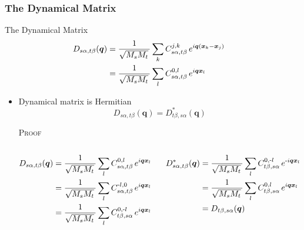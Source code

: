 \begin{frame}
  \frametitle{The Dynamical Matrix}
  The Dynamical Matrix
  \begin{align*}
    \mathcolor{black}{
      D_{s\alpha,t\beta}(\boldsymbol{q})
    }
    &=
    {1\over\sqrt{M_sM_t}\,}
    \sum_k
    C_{s\alpha,t\beta}^{j, k}\,
    e^{i\boldsymbol{q}(\boldsymbol{x}_k - \boldsymbol{x}_j)} \cr
    &=
    {1\over\sqrt{M_sM_t}\,}
    \sum_l
    C_{s\alpha,t\beta}^{0, l}\,
    e^{i\boldsymbol{q}\boldsymbol{x}_l}
  \end{align*}

  \begin{itemize}
  \item Dynamical matrix is Hermitian
    \begin{equation*}
      D_{s\alpha,t\beta}(\boldsymbol{q})
      =
      D^*_{t\beta,s\alpha}(\boldsymbol{q})
    \end{equation*}
    
    \begin{block}{\textsc{Proof}}
      \small
      \begin{columns}[t]
        \begin{column}{0.5\textwidth}
          \begin{align*}
            D_{s\alpha,t\beta}(\boldsymbol{q})
            &=
            {1\over\sqrt{M_sM_t}\,}
            \sum_l
            C_{s\alpha,t\beta}^{0, l}\,
              e^{i\boldsymbol{q}\boldsymbol{x}_l} \cr
            &= 
            {1\over\sqrt{M_sM_t}\,}
            \sum_l
            C_{s\alpha,t\beta}^{\text{-}l, 0}\,
              e^{i\boldsymbol{q}\boldsymbol{x}_l} \cr
            &= 
            {1\over\sqrt{M_sM_t}\,}
            \sum_l
            C_{t\beta,s\alpha}^{0, \text{-}l}\,
              e^{i\boldsymbol{q}\boldsymbol{x}_l} \cr
          \end{align*}
        \end{column}
        \begin{column}{0.4\textwidth}
          \begin{align*}
            D^*_{s\alpha,t\beta}(\boldsymbol{q})
            &=
            {1\over\sqrt{M_sM_t}\,}
            \sum_l
            C_{t\beta,s\alpha}^{0, \text{-}l}\,
              e^{\text{-}i\boldsymbol{q}\boldsymbol{x}_l} \cr
            &=
            {1\over\sqrt{M_sM_t}\,}
            \sum_l
            C_{t\beta,s\alpha}^{0, l}\,
              e^{i\boldsymbol{q}\boldsymbol{x}_l} \cr
            &= 
            D_{t\beta,s\alpha}(\boldsymbol{q})
          \end{align*}
        \end{column}
        
      \end{columns}
    \end{block}
  \end{itemize}
\end{frame}